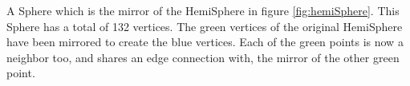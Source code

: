\label{fig:fullSphere} A Sphere which is the mirror of the HemiSphere in figure \ref{fig:hemiSphere}. This Sphere has a total of 132 vertices. The green vertices of the original HemiSphere have been mirrored to create the blue vertices. Each of the green points is now a neighbor too, and shares an edge connection with, the mirror of the other green point.